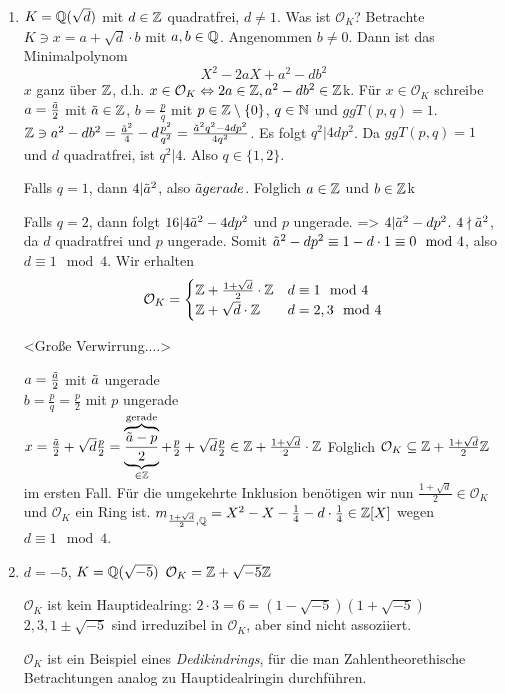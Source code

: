 \documentclass[../main.tex]{subfiles}
\begin{document}
\begin{example*}
    \begin{enumerate}[label=(\arabic*)]
        \item $K=\mathbb{Q}(\sqrt{d})$ mit $d\in \mathbb{Z}$ quadratfrei, $d\neq 1$.
        Was ist $\mathcal{O}_K$? Betrachte $K\ni x = a+\sqrt{d}\cdot b$ mit $a,b\in \mathbb{Q}$.
        Angenommen $b\neq 0$. Dann ist das Minimalpolynom $$X^2-2aX+a^2-db^2$$
        $x$ ganz über $\mathbb{Z}$, d.h. $x\in \mathcal{O}_K\Leftrightarrow 2a\in \mathbb{Z}, a^2-db^2\in \mathbb{Z}$k.
        Für $x\in \mathcal{O}_K$ schreibe $a=\frac{\Tilde{a}}{2}$ mit $\Tilde{a}\in \mathbb{Z}$, $b=\frac{p}{q}$ mit $p\in \mathbb{Z}\setminus\{0\}$, $q\in \mathbb{N}$ und $ggT(p,q)=1$.
        $\mathbb{Z}\ni a^2 - db^2 = \frac{\Tilde{a}^2}{4}-d\frac{p^2}{q^2} = \frac{\Tilde{a}^2q^2-4dp^2}{4q^2}$.
        Es folgt $q^2|4dp^2$. Da $ggT(p,q)=1$ und $d$ quadratfrei, ist $q^2|4$. Also $q\in \{1,2\}$.

        Falls $q=1$, dann $4|\Tilde{a}^2$, also $\Tilde{a} gerade$.
        Folglich $a\in \mathbb{Z}$ und $b\in \mathbb{Z}$k

        Falls $q=2$, dann folgt $16| 4\Tilde{a}^2-4dp^2$ und $p$ ungerade. => $4|\Tilde{a}^2-dp^2$. $4\nmid \Tilde{a}^2$, da $d$ quadratfrei und $p$ ungerade.
        Somit $\Tilde{a}^2-dp^2 \equiv 1-d\cdot 1 \equiv 0\mod 4$, also $d\equiv 1 \mod 4$.
        Wir erhalten
        $$\mathcal{O}_K = \begin{cases}
            \mathbb{Z}+ \frac{1+\sqrt{d}}{2}\cdot \mathbb{Z} & d\equiv 1 \mod 4\\
            \mathbb{Z} + \sqrt{d} \cdot \mathbb{Z} & d= 2,3 \mod 4
        \end{cases}$$
        
        <Große Verwirrung....>
        
        $a=\frac{\Tilde{a}}{2}$ mit $\Tilde{a}$ ungerade\\
        $b=\frac{p}{q} = \frac{p}{2}$ mit $p$ ungerade\\
        $x=\frac{\Tilde{a}}{2}+\sqrt{d}\frac{p}{2} =\overbrace{\underbrace{\frac{\Tilde{a}-p}{2}}_{\in\mathbb{Z}}}^{\text{gerade}} + \frac{p}{2}+\sqrt{d}\frac{p}{2}\in \mathbb{Z} + \frac{1+\sqrt{d}}{2}\cdot \mathbb{Z}$
        Folglich $\mathcal{O}_K\subseteq \mathbb{Z} + \frac{1+\sqrt{d}}{2}\mathbb{Z}$ im ersten Fall.
        Für die umgekehrte Inklusion benötigen wir nun $\frac{1+\sqrt{d}}{2}\in \mathcal{O}_K$ und $\mathcal{O}_K$ ein Ring ist.
        $m_{\frac{1+\sqrt{d}}{2},\mathbb{Q}} = X^2 - X - \frac{1}{4}-d\cdot \frac{1}{4}\in \mathbb{Z}[X]$ wegen $d\equiv 1 \mod 4$.
        \item $d=-5$, $K=\mathbb{Q}(\sqrt{-5})$
        $\mathcal{O}_K = \mathbb{Z} + \sqrt{-5}\mathbb{Z}$

        $\mathcal{O}_K$ ist kein Hauptidealring:
        $2\cdot 3 = 6 = (1-\sqrt{-5})(1+\sqrt{-5})$
        $2,3,1\pm\sqrt{-5}$ sind irreduzibel in $\mathcal{O}_K$, aber sind nicht assoziiert.

        $\mathcal{O}_K$ ist ein Beispiel eines \emph{Dedikindrings}, für die man Zahlentheorethische Betrachtungen analog zu Hauptidealringin durchführen.
    \end{enumerate}
\end{example*}
\end{document}
